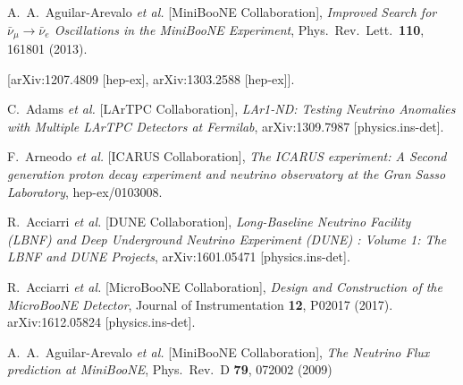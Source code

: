 \documentclass[a4paper,11pt]{article}
\begin{document}
\clearpage
\begin{thebibliography}{99}




  A.~A.~Aguilar-Arevalo {\it et al.} 
  [MiniBooNE Collaboration],
  \textit{Improved Search for $\bar \nu_\mu \rightarrow \bar \nu_e$ Oscillations in the MiniBooNE Experiment},
  Phys.\ Rev.\ Lett.\  {\bf 110}, 161801 (2013).

  [arXiv:1207.4809 [hep-ex], arXiv:1303.2588 [hep-ex]].


  C.~Adams {\it et al.} [LArTPC Collaboration],
  \textit{LAr1-ND: Testing Neutrino Anomalies with Multiple LArTPC Detectors at Fermilab},
  arXiv:1309.7987 [physics.ins-det].

  F.~Arneodo {\it et al.} [ICARUS Collaboration],
  \textit{The ICARUS experiment: A Second generation proton decay experiment and neutrino observatory at the Gran Sasso Laboratory},
  hep-ex/0103008.

  R.~Acciarri {\it et al.} [DUNE Collaboration],
  \textit{Long-Baseline Neutrino Facility (LBNF) and Deep Underground Neutrino Experiment (DUNE) : Volume 1: The LBNF and DUNE Projects},
  arXiv:1601.05471 [physics.ins-det].

  R.~Acciarri {\it et al.} [MicroBooNE Collaboration],
  \textit{Design and Construction of the MicroBooNE Detector},
  Journal of Instrumentation {\bf 12}, P02017 (2017).
  arXiv:1612.05824 [physics.ins-det].

  A.~A.~Aguilar-Arevalo {\it et al.} [MiniBooNE Collaboration],
  \textit{The Neutrino Flux prediction at MiniBooNE},
  Phys.\ Rev.\ D {\bf 79}, 072002 (2009)


\end{thebibliography}
\end{document}
